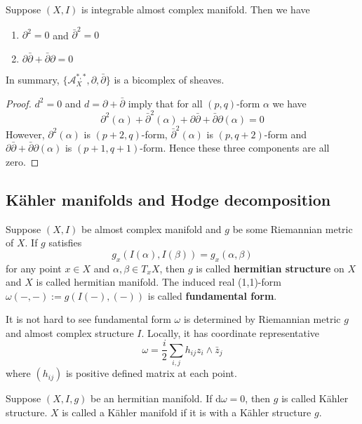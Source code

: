 \documentclass[11pt,oneside,a4paper]{amsart}
\begin{document}
\begin{secprop}
	Suppose $(X,I)$ is integrable almost complex manifold. Then we have 
	\begin{enumerate}
		\item $\partial^2 = 0 $ and $\bar{\partial}^2=0$
		\item $\partial \bar{\partial} + \bar{\partial} \partial =0$
	\end{enumerate}
	In summary, $\{\mathcal{A}_X^{*,*}, \partial, \bar{\partial} \}$ is a bicomplex of sheaves.
\end{secprop}
\begin{proof}
	$d^2=0$ and $d= \partial + \bar{\partial}$ imply that for all $(p,q)$-form $\alpha$ we have \[
	\partial^2(\alpha) + \bar{\partial}^2(\alpha) + \partial \bar{\partial} + \bar{\partial} \partial (\alpha) =0
	\]
	However, $\partial^2(\alpha)$ is $(p+2,q)$-form, $\bar{\partial}^2(\alpha)$ is $(p,q+2)$-form and $\partial \bar{\partial} + \bar{\partial}\partial (\alpha)$ is $(p+1, q+1)$-form. Hence these three components are all zero.
\end{proof}
\subsection{K\"ahler manifolds and Hodge decomposition}
\begin{secdefn}
	Suppose $(X,I)$ be almost complex manifold and $g$ be some Riemannian metric of $X$. If $g$ satisfies\[
	g_x(I(\alpha),I(\beta))=g_x(\alpha,\beta)
	\]
	for any point $x \in X$ and $\alpha, \beta \in T_xX$, then $g$ is called \textbf{hermitian structure} on $X$ and $X$ is called hermitian manifold. The induced real (1,1)-form $\omega(-,-) := g(I(-),(-))$ is called \textbf{fundamental form}.
\end{secdefn}
It is not hard to see fundamental form $\omega$ is determined by Riemannian metric $g$ and almost complex structure $I$. Locally, it has coordinate representative 
\[
\omega = \frac{i}{2}\sum_{i,j} h_{ij} z_i \wedge \bar{z}_j
\]
where $(h_{ij})$ is positive defined matrix at each point.
\begin{secdefn}
	Suppose $(X,I,g)$ be an hermitian manifold. If $\mathrm{d}\omega = 0$, then $g$ is called K\"ahler structure. $X$ is called a K\"ahler manifold if it is with a K\"ahler structure $g$. 
\end{secdefn}
\end{document}
